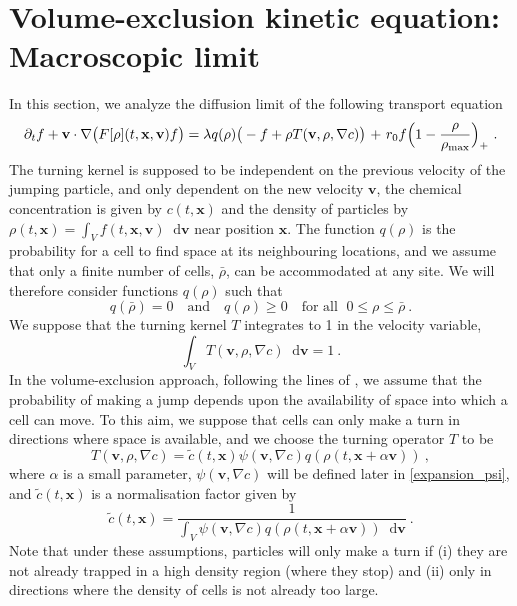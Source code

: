 \documentclass{aims} %
\theoremstyle{definition}
\newcommand*\diff{\mathop{}\!\mathrm{d}}
\begin{document}
\section{Volume-exclusion kinetic equation: Macroscopic limit}
\label{sec:model}
In this section, we analyze the diffusion limit of the following transport equation
\begin{equation}
    \partial_t f+\mathbf{v}\cdot \nabla\big(F[\rho](t,\mathbf{x},\mathbf{v}) f\big)= \lambda q(\rho)\big(-f+\rho T(\mathbf{v},\rho,\nabla c)\big){\ +\ r_0f\Bigl(1-\frac{\rho}{\rho_{\textnormal{max}}} \Bigr)_+}\ . \nonumber
\end{equation}
The turning kernel is supposed to be independent on the previous velocity of the jumping particle, and only dependent on the new velocity $\mathbf{v}$, the chemical concentration is given by $c(t,\mathbf{x})$ and the density of particles by $\rho(t,\mathbf{x})=\int_V f(t,\textbf{x},\mathbf{v})\diff \mathbf{v}$ near position $\mathbf{x}$.
\noindent The function $q(\rho)$ is the probability {for a cell to find} space at its neighbouring locations, and we assume that only a finite number of cells, $\bar{\rho}$, can be accommodated at any site. We will therefore consider functions $q(\rho)$ such that
\begin{equation}
q(\bar{\rho}) = 0 \quad \text{and} \quad q(\rho) \geq 0 \quad \text{for all } \; 0\leq \rho \leq \bar{\rho}\ . \nonumber
\end{equation}
We {suppose that the turning kernel $T$ integrates to 1 in the velocity variable},
\begin{equation}
\int_V T(\textbf{v},\rho,\nabla c)\diff \mathbf{v}=1\ . \nonumber
\end{equation}
In the volume-exclusion approach, following the lines of \cite{Hillen2009}, we assume that the probability of making a jump depends upon the availability of space into which {{a cell}} can move. To this aim, we suppose that cells can only make a turn in directions where space is available, and we choose the turning operator $T$ to be
\begin{equation*}
    T(\mathbf{v},\rho,\nabla c)=\tilde{c}(t,\mathbf{x})\psi(\mathbf{v},\nabla c) q(\rho(t,\mathbf{x}+ \alpha \mathbf{v}))\ ,
\end{equation*}
\noindent where $\alpha$ is a small parameter, $\psi(\mathbf{v},\nabla c)$ will be defined later in \eqref{expansion_psi}, and $\tilde{c}(t,\mathbf{x})$ is a normalisation factor given by
\[
\tilde{c}(t,\mathbf{x})=\frac{1}{\displaystyle\int_{V} \psi(\mathbf{v},\nabla c) q(\rho(t,\mathbf{x}+ \alpha \mathbf{v}))\diff \mathbf{v} }\ .
\]
\noindent Note that under these assumptions, particles will only make a turn  if (i) they are not already trapped in a high density region (where they stop) and (ii) only in directions where the density of cells is not already too large. 
\end{document}
